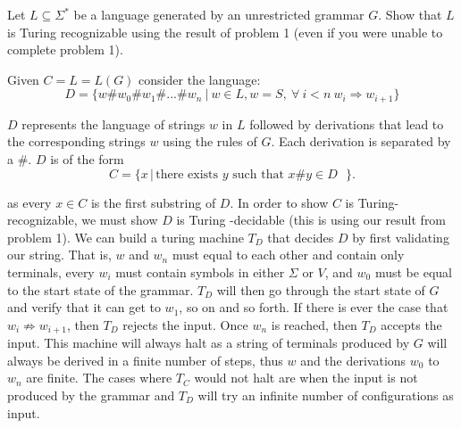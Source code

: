 Let $L \subseteq \Sigma^{*}$ be a language generated by an unrestricted grammar $G$.  Show that $L$ is Turing recognizable using the result of problem 1 (even if you were unable to complete problem 1).  


	

\begin{solution}

Given $C = L = L(G)$ consider the language:
\[
D = \{w\#w_0\#w_1\#...\#w_n ~|~ w\in L, w = S, ~ \forall ~ i<n ~ w_i \Longrightarrow w_{i+1}\}
\]

$D$ represents the language of strings $w$ in $L$ followed by derivations that lead to the corresponding strings $w$ using the rules of $G$. Each derivation is separated by a $\#$. $D$ is of the form 
\[
C = \{ x \,|\, \mbox{there exists $y$ such that $x \# y  \in D$ } \}.
\]

as every $x\in C$ is the first substring of $D$. In order to show $C$ is Turing-recognizable, we must show $D$ is Turing -decidable (this is using our result from problem 1). We can build a turing machine $T_D$ that decides $D$ by first validating our string. That is, $w$ and $w_n$ must equal to each other and contain only terminals, every $w_i$ must contain symbols in either $\Sigma \mbox{ or } V$, and $w_0$ must be equal to the start state of the grammar. $T_D$ will then go through the start state of $G$ and verify that it can get to $w_1$, so on and so forth. If there is ever the case that $w_i \not \Longrightarrow w_{i+1}$, then $T_D$ rejects the input. Once $w_n$ is reached, then $T_D$ accepts the input. This machine will always halt as a string of terminals produced by $G$ will always be derived in a finite number of steps, thus $w$ and the derivations $w_0$ to $w_n$ are finite. The cases where $T_C$ would not halt are when the input is not produced by the grammar and $T_D$ will try an infinite number of configurations as input.
\end{solution}
